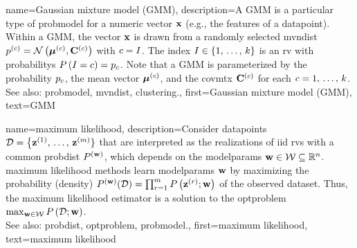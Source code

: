 {name={Gaussian mixture model (GMM)}, 
	description={A GMM 
		is a particular type of \gls{probmodel} for a numeric \gls{vector} ${\bf x}$ (e.g., 
		the \glspl{feature} of a \gls{datapoint}). Within a GMM, the \gls{vector} ${\bf x}$ 
		is drawn from a randomly selected \gls{mvndist} 
		$p^{(c)} = \mathcal{N}\left({\bm \mu}^{(c)},\mathbf{C}^{(c)}\right)$ with 
		$c = I$. The index $I \in \{1, \,\ldots, \,k\}$ is an \gls{rv} with 
		\glspl{probability} $P\left(I=c\right) = p_{c}$.
	     	Note that a GMM is parameterized by the \gls{probability} $p_{c}$, the 
		\gls{mean} \gls{vector} ${\bm \mu}^{(c)}$, and the \gls{covmtx} $\mathbf{C}^{(c)}$ 
		for each $c=1, \,\ldots, \,k$. 
				\\
		See also: \gls{probmodel}, \gls{mvndist}, \gls{clustering}.},
	first={Gaussian mixture model (GMM)},
	text={GMM} 
}
 
{name={maximum likelihood}, 
	description={Consider \glspl{datapoint} 
	$\mathcal{D}=\big\{ {\bf z}^{(1)}, \,\ldots, \,{\bf z}^{(m)} \}$ 
	that are interpreted as the \glspl{realization} of \gls{iid} \glspl{rv} 
	with a common \gls{probdist} $P^{({\bf w})}$, which depends 
	on the \glspl{modelparam} ${\bf w} \in \mathcal{W} \subseteq \mathbb{R}^{n}$. 
		\Gls{maximum} likelihood methods learn \glspl{modelparam} ${\bf w}$ by maximizing 
		the probability (density) $P^{({\bf w})}(\mathcal{D}) = \prod_{r=1}^{m} P\left({\bf z}^{(r)}; {\bf w}\right)$ 
		of the observed \gls{dataset}. Thus, the \gls{maximum} likelihood estimator is a 
		solution to the \gls{optproblem} $\max_{{\bf w} \in \mathcal{W}} P\left(\mathcal{D}; {\bf w}\right)$.
				\\
		See also: \gls{probdist}, \gls{optproblem}, \gls{probmodel}.},
	first={maximum likelihood},
	text={maximum likelihood}
}


